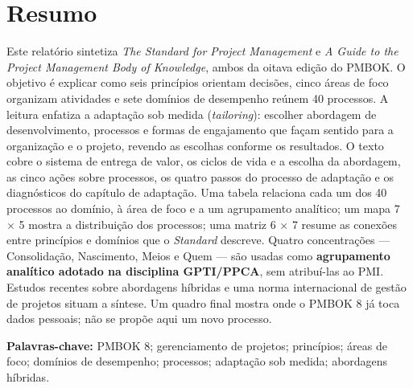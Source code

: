 \documentclass[11pt,a4paper]{article}
\newcommand{\onelineskip}{\baselineskip}
\newenvironment{resumo}[1][Resumo]{\section*{#1}\noindent\ignorespaces}{\bigskip}
\begin{document}
\begin{resumo}
Este relatório sintetiza \textit{The Standard for Project Management} e \textit{A Guide to the Project Management Body of Knowledge}, ambos da oitava edição do PMBOK. O objetivo é explicar como seis princípios orientam decisões, cinco áreas de foco organizam atividades e sete domínios de desempenho reúnem 40 processos. A leitura enfatiza a adaptação sob medida (\textit{tailoring}): escolher abordagem de desenvolvimento, processos e formas de engajamento que façam sentido para a organização e o projeto, revendo as escolhas conforme os resultados. O texto cobre o sistema de entrega de valor, os ciclos de vida e a escolha da abordagem, as cinco ações sobre processos, os quatro passos do processo de adaptação e os diagnósticos do capítulo de adaptação. Uma tabela relaciona cada um dos 40 processos ao domínio, à área de foco e a um agrupamento analítico; um mapa 7 \ensuremath{\times} 5 mostra a distribuição dos processos; uma matriz 6 \ensuremath{\times} 7 resume as conexões entre princípios e domínios que o \textit{Standard} descreve. Quatro concentrações — Consolidação, Nascimento, Meios e Quem — são usadas como \textbf{agrupamento analítico adotado na disciplina GPTI/PPCA}, sem atribuí-las ao PMI. Estudos recentes sobre abordagens híbridas e uma norma internacional de gestão de projetos situam a síntese. Um quadro final mostra onde o PMBOK 8 já toca dados pessoais; não se propõe aqui um novo processo.

\vspace{\onelineskip}
\noindent\textbf{Palavras-chave:} PMBOK 8; gerenciamento de projetos; princípios; áreas de foco; domínios de desempenho; processos; adaptação sob medida; abordagens híbridas.
\end{resumo}
\end{document}
